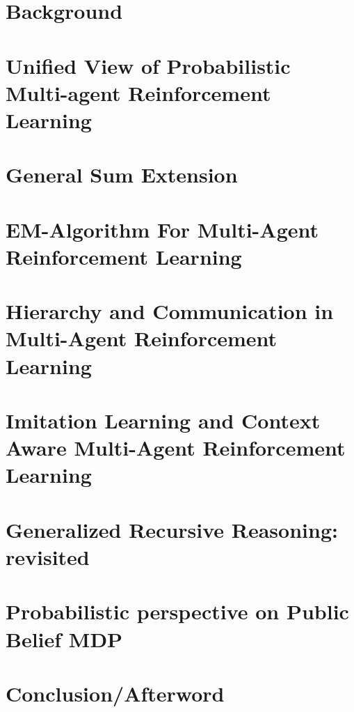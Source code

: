 \documentclass{report}
\begin{document}
\chapter{Background}


\chapter{Unified View of Probabilistic Multi-agent Reinforcement Learning}


\chapter{General Sum Extension}


\chapter{EM-Algorithm For Multi-Agent Reinforcement Learning}


\chapter{Hierarchy and Communication in Multi-Agent Reinforcement Learning}


\chapter{Imitation Learning and Context Aware Multi-Agent Reinforcement Learning}


\chapter{Generalized Recursive Reasoning: revisited}


\chapter{Probabilistic perspective on Public Belief MDP}


\chapter{Conclusion/Afterword}


\appendix
\end{document}
